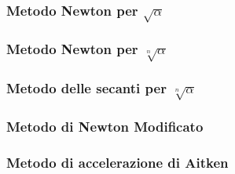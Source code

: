 \subsubsection{Metodo Newton per $\sqrt{\alpha}$}

\subsubsection{Metodo Newton per $\sqrt[n]{\alpha}$}

\subsubsection{Metodo delle secanti per $\sqrt[n]{\alpha}$}

\subsubsection{Metodo di Newton Modificato}

\subsubsection{Metodo di accelerazione di Aitken}
